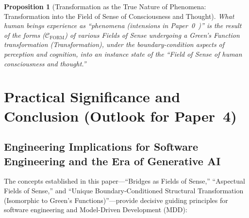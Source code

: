 \documentclass[11pt,a4paper]{article}
\theoremstyle{definition}
\theoremstyle{plain}
\newtheorem{proposition}{Proposition}[section]
\theoremstyle{remark}
\newcommand{\CFORM}{\mathcal{C}_{\mathrm{FORM}}}
\begin{document}
\begin{proposition}[Transformation as the True Nature of Phenomena: Transformation into the Field of Sense of Consciousness and Thought]\label{prop:phenomena-transformation}
What human beings experience as ``phenomena (intensions in Paper~0~\cite{ota2026paper0})'' is the result of the forms ($\CFORM$) of various Fields of Sense undergoing a Green's Function transformation (Transformation), under the boundary-condition aspects of perception and cognition, into an instance state of the ``Field of Sense of human consciousness and thought.''
\end{proposition}

\section{Practical Significance and Conclusion (Outlook for Paper~4)}

\subsection{Engineering Implications for Software Engineering and the Era of Generative AI}
The concepts established in this paper---``Bridges as Fields of Sense,'' ``Aspectual Fields of Sense,'' and ``Unique Boundary-Conditioned Structural Transformation (Isomorphic to Green's Functions)''---provide decisive guiding principles for software engineering and Model-Driven Development (MDD):
\end{document}
